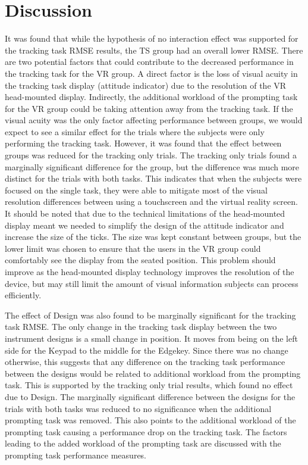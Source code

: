 \section{Discussion}
\label{sec:de_discussion}


It was found that while the hypothesis of no interaction effect was supported for the tracking task RMSE results, the TS group  had an overall lower RMSE.
There are two potential factors that could contribute to the decreased performance in the tracking task for the VR group.
A direct factor is the loss of visual acuity in the tracking task display (attitude indicator) due to the resolution of the VR head-mounted display.
Indirectly, the additional workload of the prompting task for the VR group could be taking attention away from the tracking task.
If the visual acuity was the only factor affecting performance between groups, we would expect to see a similar effect for the trials where the subjects were only performing the tracking task.
However, it was found that the effect between groups was reduced for the tracking only trials.
The tracking only trials found a marginally significant difference for the group, but the difference was much more distinct for the trials with both tasks.
This indicates that when the subjects were focused on the single task, they were able to mitigate most of the visual resolution differences between using a touchscreen and the virtual reality screen.
It should be noted that due to the technical limitations of the head-mounted display meant we needed to simplify the design of the attitude indicator and increase the size of the ticks.
The size was kept constant between groups, but the lower limit was chosen to ensure that the users in the VR group could comfortably see the display from the seated position.
This problem should improve as the head-mounted display technology improves the resolution of the device, but may still limit the amount of visual information subjects can process efficiently.

The effect of Design was also found to be marginally significant for the tracking task RMSE.
The only change in the tracking task display between the two instrument designs is a small change in position.
It moves from being on the left side for the Keypad to the middle for the Edgekey.
Since there was no change otherwise, this suggests that any difference on the tracking task performance between the designs would be related to additional workload from the prompting task.
This is supported by the tracking only trial results, which found no effect due to Design.
The marginally significant difference between the designs for the trials with both tasks was reduced to no significance when the additional prompting task was removed.
This also points to the additional workload of the prompting task causing a performance drop on the tracking task.
The factors leading to the added workload of the prompting task are discussed with the prompting task performance measures.

